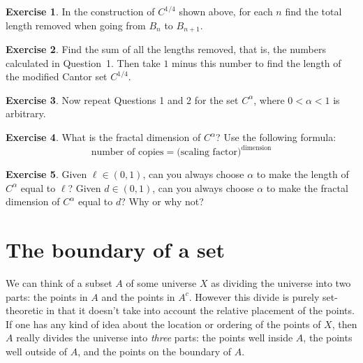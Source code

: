 \documentclass[11pt,oneside]{amsbook}
\theoremstyle{definition}
\newtheorem{exerc}{Exercise}[section]
\theoremstyle{plain}
\theoremstyle{definition}
\theoremstyle{remark}
\numberwithin{equation}{section}
\numberwithin{figure}{section}
\begin{document}
\begin{center}
\end{center}

\begin{exerc}
  In the construction of $C^{1/4}$ shown above, for each $n$ find the total length removed when going from $B_n$ to $B_{n+1}$.
\end{exerc}

\begin{exerc}
  Find the sum of all the lengths removed, that is, the numbers calculated in Question~1. Then take $1$ minus this number to find the length of the modified Cantor set $C^{1/4}$.
\end{exerc}

\begin{exerc}
  Now repeat Questions 1 and 2 for the set $C^\alpha$, where $0<\alpha<1$ is arbitrary.
\end{exerc}

\begin{exerc}
  What is the fractal dimension of $C^\alpha$?  Use the following formula:
  \[\text{number of copies}=\text{(scaling factor)}^\text{dimension}
  \]
\end{exerc}

\begin{exerc}
  Given $\ell\in(0,1)$, can you always choose $\alpha$ to make the length of $C^\alpha$ equal to $\ell$? Given $d\in(0,1)$, can you always choose $\alpha$ to make the fractal dimension of $C^\alpha$ equal to $d$? Why or why not?
\end{exerc}

\newpage
\section{The boundary of a set}

We can think of a subset $A$ of some universe $X$ as dividing the universe into two parts: the points in $A$ and the points in $A^c$. However this divide is purely set-theoretic in that it doesn't take into account the relative placement of the points. If one has any kind of idea about the location or ordering of the points of $X$, then $A$ really divides the universe into \emph{three} parts: the points well inside $A$, the points well outside of $A$, and the points on the boundary of $A$.
\end{document}
